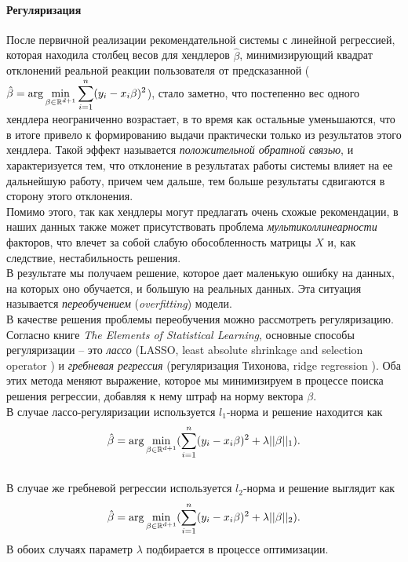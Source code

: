 \documentclass[14pt]{matmex-diploma}
\begin{document}
\paragraph{Регуляризация}
\indent После первичной реализации рекомендательной системы с линейной регрессией, которая находила столбец весов для хендлеров $\hat\beta$, минимизирующий квадрат отклонений реальной реакции пользователя от предсказанной ($\displaystyle \hat\beta = {\rm arg}\min_{\beta\in\mathbb{R}^{d+1}} \sum_{i=1}^n (y_i - x_i \beta)^2$), стало заметно, что постепенно вес одного хендлера неограниченно возрастает, в то время как остальные уменьшаются, что в итоге привело к формированию выдачи практически только из результатов этого хендлера. Такой эффект называется \textit{положительной обратной связью}, и характеризуется тем, что отклонение в результатах работы системы влияет на ее дальнейшую работу, причем чем дальше, тем больше результаты сдвигаются в сторону этого отклонения.
\\\indent Помимо этого, так как хендлеры могут предлагать очень схожые рекомендации, в наших данных также может присутствовать проблема \textit{мультиколлинеарности} факторов, что влечет за собой слабую обособленность матрицы $X$ и, как следствие, нестабильность решения.
\\\indent В результате мы получаем решение, которое дает маленькую ошибку на данных, на которых оно обучается, и большую на реальных данных. Эта ситуация называется \textit{переобучением} (\textit{overfitting}) модели.
\\\indent В качестве решения проблемы переобучения можно рассмотреть регуляризацию. Согласно книге \textit{The Elements of Statistical Learning}\cite{hastie2001elements}, основные способы регуляризации -- это \textit{лассо} (LASSO, least absolute shrinkage and selection operator \cite{lasso}) и \textit{гребневая регрессия} (регуляризация Тихонова, ridge regression \cite{ridge}). Оба этих метода меняют выражение, которое мы минимизируем в процессе поиска решения регрессии, добавляя к нему штраф на норму вектора $\beta$. 
\\\indent В случае лассо-регуляризации используется $l_1$-норма и решение находится как $$\displaystyle \hat\beta = {\rm arg}\min_{\beta\in\mathbb{R}^{d+1}}( \sum_{i=1}^n (y_i - x_i \beta)^2 + \lambda ||\beta||_1).$$
\\\indent В случае же гребневой регрессии используется $l_2$-норма и решение выглядит как $$\displaystyle \hat\beta = {\rm arg}\min_{\beta\in\mathbb{R}^{d+1}}( \sum_{i=1}^n (y_i - x_i \beta)^2 + \lambda ||\beta||_2).$$ В обоих случаях параметр $\lambda$ подбирается в процессе оптимизации.
\end{document}
